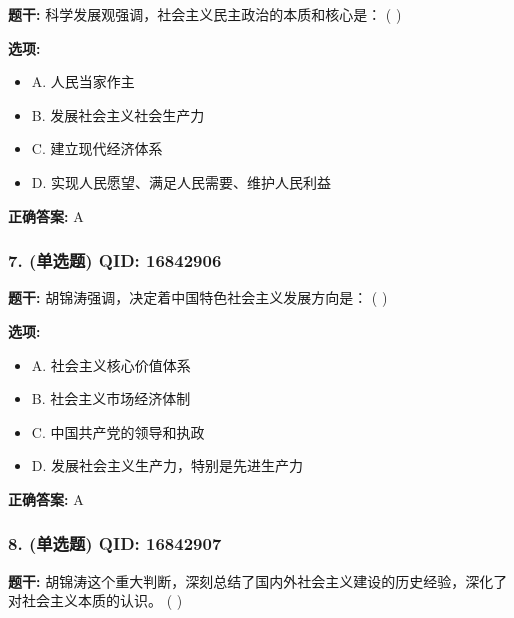 \documentclass[12pt,UTF8]{ctexart}
\begin{document}
\textbf{题干:}
科学发展观强调，社会主义民主政治的本质和核心是： ( )

\textbf{选项:}
\begin{itemize}[leftmargin=*]

  \item A. 人民当家作主

  \item B. 发展社会主义社会生产力

  \item C. 建立现代经济体系

  \item D. 实现人民愿望、满足人民需要、维护人民利益

\end{itemize}

\textbf{正确答案:}
A

\vspace{0.3em}\hrulefill\vspace{0.7em}

\subsubsection*{7. (单选题) \small QID: 16842906}

\textbf{题干:}
胡锦涛强调，决定着中国特色社会主义发展方向是： ( )

\textbf{选项:}
\begin{itemize}[leftmargin=*]

  \item A. 社会主义核心价值体系

  \item B. 社会主义市场经济体制

  \item C. 中国共产党的领导和执政

  \item D. 发展社会主义生产力，特别是先进生产力

\end{itemize}

\textbf{正确答案:}
A

\vspace{0.3em}\hrulefill\vspace{0.7em}

\subsubsection*{8. (单选题) \small QID: 16842907}

\textbf{题干:}
胡锦涛这个重大判断，深刻总结了国内外社会主义建设的历史经验，深化了对社会主义本质的认识。 ( )
\end{document}

